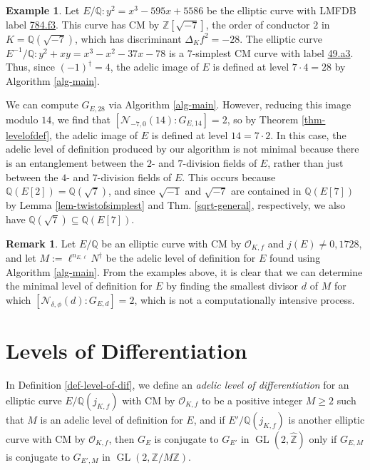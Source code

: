 \documentclass[11pt]{amsart}
\theoremstyle{definition}
\newtheorem{remark}[defn]{Remark}
\newtheorem{example}[defn]{Example}
\newcommand{\Q}{\mathbb{Q}}
\newcommand{\Z}{\mathbb{Z}}
\newcommand{\Of}{\mathcal{O}_{K,f}}
\newcommand{\GL}{\operatorname{GL}}
\begin{document}
\begin{example}
    Let $E/\Q : y^2=x^3-595x+5586$ be the elliptic curve with LMFDB label \href{https://www.lmfdb.org/EllipticCurve/Q/784/f/3}{784.f3}. This curve has CM by $\Z[\sqrt{-7}]$, the order of conductor $2$ in $K = \Q(\sqrt{-7})$, which has discriminant $\Delta_K f^2 = -28$. The elliptic curve $E^{-1}/\Q : y^2+xy=x^3-x^2-37x-78$ is a $7$-simplest CM curve with label  \href{https://www.lmfdb.org/EllipticCurve/Q/49/a/3}{49.a3}. Thus, since $(-1)^{\dagger} = 4$, the adelic image of $E$ is defined at level $7 \cdot 4 = 28$ by Algorithm \ref{alg-main}. 
    
    We can compute $G_{E, 28}$ via Algorithm \ref{alg-main}. However, reducing this image modulo $14$, we find that $[\mathcal{N}_{-7, 0}(14) : G_{E, 14}] = 2$, so by Theorem \ref{thm-levelofdef}, the adelic image of $E$ is defined at level $14 = 7 \cdot 2$. In this case, the adelic level of definition produced by our algorithm is not minimal because there is an entanglement between the $2$- and $7$-division fields of $E$, rather than just between the $4$- and $7$-division fields of $E$. This occurs because $\Q(E[2]) = \Q(\sqrt{7})$, and since $\sqrt{-1}$ and $\sqrt{-7}$ are contained in $\Q(E[7])$ by Lemma \ref{lem-twistofsimplest} and Thm. \ref{sqrt-general}, respectively, we also have $\Q(\sqrt{7}) \subseteq \Q(E[7])$.
\end{example}

\begin{remark}
    Let $E/\Q$ be an elliptic curve with CM by $\Of$ and $j(E) \neq 0, 1728$, and let $M :=\ell^{n_{E, \ell}} N^{\dagger}$ be the adelic level of definition for $E$ found using Algorithm \ref{alg-main}. From the examples above, it is clear that we can determine the minimal level of definition for $E$ by finding the smallest divisor $d$ of $M$ for which $[\mathcal{N}_{\delta, \phi}(d) : G_{E,d}] = 2$, which is not a computationally intensive process.
\end{remark}

\section{Levels of Differentiation}\label{sec-levelsofdiff}

In Definition \ref{def-level-of-dif}, we define an \emph{adelic level of differentiation} for an elliptic curve $E/\Q(j_{K, f})$ with CM by $\Of$ to be a positive integer $M \geq 2$ such that $M$ is an adelic level of definition for $E$, and if $E'/\Q(j_{K,f})$ is another elliptic curve with CM by $\Of$, then $G_E$ is conjugate to $G_{E'}$ in $\GL(2, \widehat{\Z})$ only if $G_{E, M}$ is conjugate to $G_{E', M}$ in $\GL(2, \Z/M\Z)$.
\end{document}
